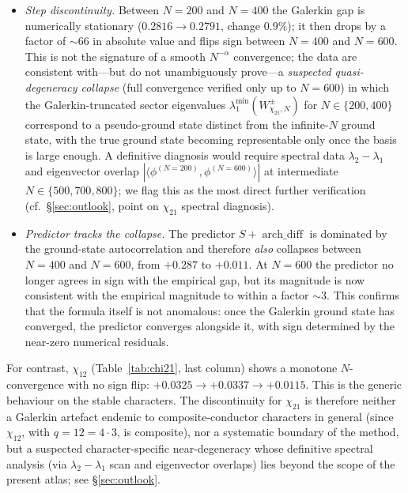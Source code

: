 \documentclass[a4paper,10pt,twocolumn]{article}
\theoremstyle{definition}
\theoremstyle{remark}
\newcommand{\chifn}{\chi}
\newcommand{\archdiff}{\operatorname{arch\_diff}}
\begin{document}
\begin{itemize}
  \item[(i)] \emph{Step discontinuity.} Between $N=200$ and $N=400$
    the Galerkin gap is numerically stationary
    ($0.2816\to 0.2791$, change $0.9\%$); it then drops by a factor
    of $\sim 66$ in absolute value and flips sign between $N=400$
    and $N=600$. This is not the signature of a smooth
    $N^{-\alpha}$ convergence; the data are consistent with---but
    do not unambiguously prove---a \emph{suspected quasi-degeneracy
    collapse} (full convergence verified only up to $N=600$) in
    which the Galerkin-truncated sector eigenvalues
    $\lambda_1^{\min}(W^\pm_{\chifn_{21},N})$ for $N\in\{200,400\}$
    correspond to a pseudo-ground state distinct from the
    infinite-$N$ ground state, with the true ground state becoming
    representable only once the basis is large enough. A definitive
    diagnosis would require spectral data
    $\lambda_2-\lambda_1$ and eigenvector overlap
    $|\langle\phi^{(N=200)},\phi^{(N=600)}\rangle|$ at intermediate
    $N\in\{500,700,800\}$; we flag this as the most direct further
    verification (cf.\ \S\ref{sec:outlook}, point on $\chifn_{21}$
    spectral diagnosis).
  \item[(ii)] \emph{Predictor tracks the collapse.} The predictor
    $S+\archdiff$ is dominated by the ground-state autocorrelation
    and therefore \emph{also} collapses between $N=400$ and $N=600$,
    from $+0.287$ to $+0.011$. At $N=600$ the predictor no longer
    agrees in sign with the empirical gap, but its magnitude is now
    consistent with the empirical magnitude to within a factor
    $\sim 3$. This confirms that the formula itself is not
    anomalous: once the Galerkin ground state has converged, the
    predictor converges alongside it, with sign determined by the
    near-zero numerical residuals.
\end{itemize}

For contrast, $\chifn_{12}$ (Table~\ref{tab:chi21}, last column)
shows a monotone $N$-convergence with no sign flip:
$+0.0325\to+0.0337\to+0.0115$. This is the generic behaviour on the
stable characters. The discontinuity for $\chifn_{21}$ is therefore
neither a Galerkin artefact endemic to composite-conductor
characters in general (since $\chifn_{12}$, with $q=12=4\cdot 3$,
is composite), nor a systematic boundary of the method, but a
suspected character-specific near-degeneracy whose definitive
spectral analysis (via $\lambda_2-\lambda_1$ scan and eigenvector
overlaps) lies beyond the scope of the present atlas; see
\S\ref{sec:outlook}.
\end{document}
